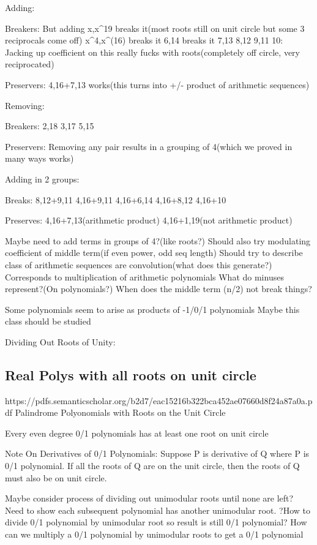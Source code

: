 \documentclass[11pt]{article}
\theoremstyle{remark}
\begin{document}
	Adding:
	
		Breakers:
		But adding x,x^19 breaks it(most roots still on unit circle but some 3 reciprocals come off)
		x^4,x^(16) breaks it
		6,14 breaks it
		7,13
		8,12
		9,11
		10: Jacking up coefficient on this really fucks with roots(completely off circle, very reciprocated)
		
		Preservers:
			4,16+7,13 works(this turns into +/- product of arithmetic sequences)
		
		
	Removing:
		
		Breakers:
			2,18
			3,17
			5,15
		
		Preservers:
			Removing any pair results in a grouping of 4(which we proved in many ways works)
			
	Adding in 2 groups:
		
		Breaks:
			8,12+9,11
			4,16+9,11
			4,16+6,14
			4,16+8,12
			4,16+10
		
		Preserves:
			4,16+7,13(arithmetic product)
			4,16+1,19(not arithmetic product)
			
	
	
	Maybe need to add terms in groups of 4?(like roots?)
	Should also try modulating coefficient of middle term(if even power, odd seq length)
	Should try to describe class of arithmetic sequences are convolution(what does this generate?)
		Corresponds to multiplication of arithmetic polynomials
	What do minuses represent?(On polynomials?)
	When does the middle term (n/2) not break things?
	
	Some polynomials seem to arise as products of -1/0/1 polynomials
		Maybe this class should be studied
		
Dividing Out Roots of Unity:

\subsection{Real Polys with all roots on unit circle}

https://pdfs.semanticscholar.org/b2d7/eac15216b322bca452ae07660d8f24a87a0a.pdf
Palindrome Polyonomials with Roots on the Unit Circle

	Every even degree 0/1 polynomials has at least one root on unit circle
	
Note On Derivatives of 0/1 Polynomials:
	Suppose P is derivative of Q where P is 0/1 polynomial. If all the roots of Q are on the unit circle, then the roots of Q must also be on unit circle.
	
Maybe consider process of dividing out unimodular roots until none are left?
	Need to show each subsequent polynomial has another unimodular root.
	?How to divide 0/1 polynomial by unimodular root so result is still 0/1 polynomial?
	How can we multiply a 0/1 polynomial by unimodular roots to get a 0/1 polynomial
	
\end{document}
